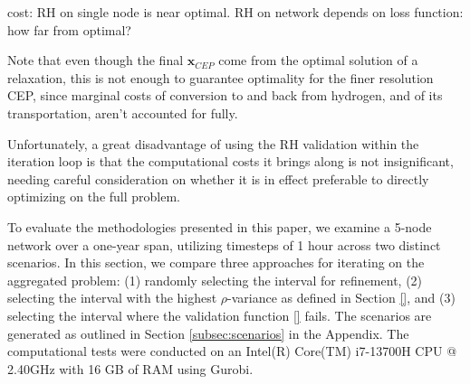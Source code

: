 {cost: RH on single node is near optimal. RH on network depends on loss function: how far from optimal?

Note that even though the final $\mathbf{x}_{CEP}$ come from the optimal solution of a relaxation, this is not enough to guarantee optimality for the finer resolution CEP, since marginal costs of conversion to and back from hydrogen, and of its transportation, aren't accounted for fully. 

Unfortunately, a great disadvantage of using the RH validation within the iteration loop is that the computational costs it brings along is not insignificant, needing careful consideration on whether it is in effect preferable to directly optimizing on the full problem.



To evaluate the methodologies presented in this paper, we examine a  5-node network over a one-year span, utilizing timesteps of 1 hour across two distinct scenarios.
 In this section, we compare three approaches for iterating on the aggregated problem: (1) randomly selecting the interval for refinement, 
 (2) selecting the interval with the highest \(\rho\)-variance as defined in Section \ref{}, and (3) selecting the interval where the validation function \ref{} fails. 
 The scenarios are generated as outlined in Section \ref{subsec:scenarios} in the Appendix. 
 The computational tests were conducted on an Intel(R) Core(TM) i7-13700H CPU @ 2.40GHz with 16 GB of RAM using Gurobi.

}
